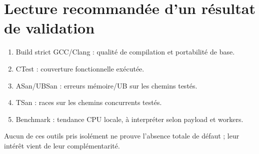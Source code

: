 \documentclass[11pt,a4paper]{article}
\begin{document}
\section{Lecture recommandée d'un résultat de validation}
\begin{enumerate}
\item Build strict GCC/Clang : qualité de compilation et portabilité de base.
\item CTest : couverture fonctionnelle exécutée.
\item ASan/UBSan : erreurs mémoire/UB sur les chemins testés.
\item TSan : races sur les chemins concurrents testés.
\item Benchmark : tendance CPU locale, à interpréter selon payload et workers.
\end{enumerate}
Aucun de ces outils pris isolément ne prouve l'absence totale de défaut ; leur intérêt vient de leur complémentarité.
\end{document}
